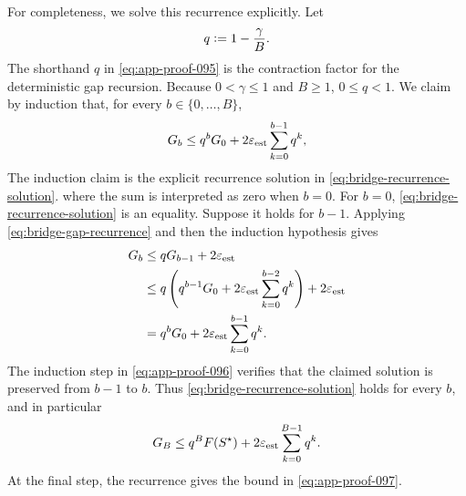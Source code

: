 \documentclass[11pt]{article}
\numberwithin{equation}{section}
\newcommand{\1}{\mathbf 1}
\newcommand{\defeq}{\vcentcolon=}
\newcommand{\eps}{\varepsilon}
\begin{document}
For completeness, we solve this recurrence explicitly.  Let
\begin{equation}
\label{eq:app-proof-095}
q\defeq 1-\frac{\gamma}{B}.
\end{equation}
The shorthand \(q\) in \eqref{eq:app-proof-095} is the contraction factor
for the deterministic gap recursion.
Because \(0<\gamma\le1\) and \(B\ge1\), \(0\le q<1\).  We claim by
induction that, for every \(b\in\{0,\ldots,B\}\),
\begin{equation}
  G_b
  \le
  q^bG_0
  +
  2\eps_{\rm est}\sum_{k=0}^{b-1}q^k,
  \label{eq:bridge-recurrence-solution}
\end{equation}
The induction claim is the explicit recurrence solution in
\eqref{eq:bridge-recurrence-solution}.
where the sum is interpreted as zero when \(b=0\).  For \(b=0\),
\eqref{eq:bridge-recurrence-solution} is an equality.  Suppose it holds
for \(b-1\).  Applying \eqref{eq:bridge-gap-recurrence} and then the
induction hypothesis gives
\begin{equation}
\label{eq:app-proof-096}
\begin{aligned}
  G_b
  &\le qG_{b-1}+2\eps_{\rm est}\\
  &\le q\left(
      q^{b-1}G_0
      +
      2\eps_{\rm est}\sum_{k=0}^{b-2}q^k
    \right)
    +2\eps_{\rm est}\\
  &=
    q^bG_0
    +
    2\eps_{\rm est}\sum_{k=0}^{b-1}q^k.
\end{aligned}
\end{equation}
The induction step in \eqref{eq:app-proof-096} verifies that the claimed
solution is preserved from \(b-1\) to \(b\).  Thus
\eqref{eq:bridge-recurrence-solution} holds for every \(b\), and in
particular
\begin{equation}
\label{eq:app-proof-097}
G_B
  \le
  q^BF(S^\star)
  +
  2\eps_{\rm est}\sum_{k=0}^{B-1}q^k.
\end{equation}
At the final step, the recurrence gives the bound in
\eqref{eq:app-proof-097}.
\end{document}
